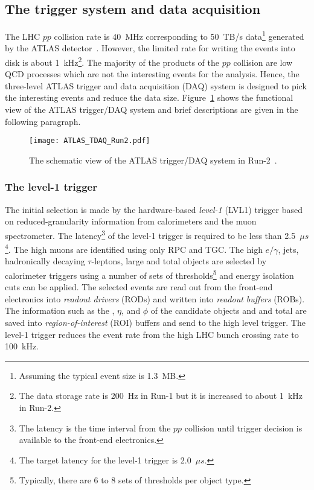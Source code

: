 
\subsection{The trigger system and data acquisition}
\label{subsec:ae_trigger}
The LHC $pp$ collision rate is 40~MHz corresponding to 50~TB/s data\footnote{Assuming the typical event size is 1.3~MB.} generated by the ATLAS detector~\cite{Kordas:2007zz}.
However, the limited rate for writing the events into disk is about 1~kHz\footnote{The data storage rate is 200~Hz in Run-1 but it is increased to about 1~kHz in Run-2.}.
The majority of the products of the $pp$ collision are low \pt QCD processes which are not the interesting events for the analysis.  
Hence, the three-level ATLAS trigger and data acquisition (DAQ) system is designed to pick the interesting events and reduce the data size.
Figure~\ref{fig:ae_tdaq} shows the functional view of the ATLAS trigger/DAQ system and brief descriptions are given in the following paragraph.

\begin{figure}[htbp]
    \begin{center}
        \texttt{[image: ATLAS\_TDAQ\_Run2.pdf]}
        \caption{The schematic view of the ATLAS trigger/DAQ system in Run-2~\cite{Martinez:2016udm}.}
        \label{fig:ae_tdaq}
    \end{center}
\end{figure}


\subsubsection{The level-1 trigger}
\label{subsubsec:ae_LVL1}
The initial selection is made by the hardware-based \textit{level-1} (LVL1) trigger based on reduced-granularity information from calorimeters and the muon spectrometer.
The latency\footnote{The latency is the time interval from the $pp$ collision until trigger decision is available to the front-end electronics.} of the level-1 trigger is required to be less than 2.5~$\mu s$\footnote{The target latency for the level-1 trigger is 2.0~$\mu s$.}.
The high \pt muons are identified using only RPC and TGC.
The high \pt $e/\gamma$, jets, hadronically decaying $\tau$-leptons, large \met and total \et objects are selected by calorimeter triggers using a number of sets of \pt thresholds\footnote{Typically, there are 6 to 8 sets of thresholds per object type.} and energy isolation cuts can be applied. 
The selected events are read out from the front-end electronics into \textit{readout drivers} (RODs) and written into \textit{readout buffers} (ROBs).
The information such as the \pt, $\eta$, and $\phi$ of the candidate objects and \met and total \et are saved into \textit{region-of-interest} (ROI) buffers and send to the high level trigger.
The level-1 trigger reduces the event rate from the high LHC bunch crossing rate to 100~kHz.

